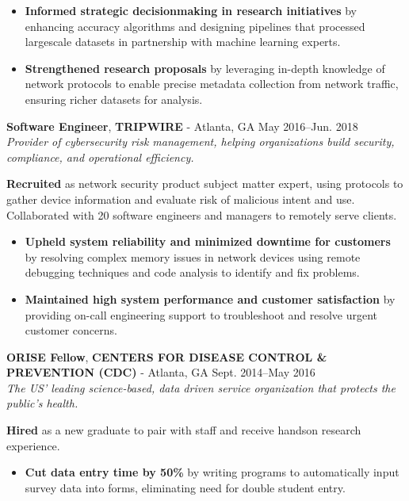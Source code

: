 \documentclass[a4paper,skipsamekey,11pt,english]{curve}
\newcommand{\makeWorkHistoryTitle}[5]{
  \begin{tcolorbox}[colback=base1!10,colframe=base1!10,frame hidden]
    {\color{blue}\textbf{#1}}, \textbf{#2} - #3 \hfill #4\\
    {\small\textit{#5}}
  \end{tcolorbox}
}
\begin{document}
  \begin{itemize}
    \item \textbf{Informed strategic decision\-making in research initiatives}
    by enhancing accuracy algorithms and designing pipelines that processed
    large\-scale datasets in partnership with machine learning experts.
    \item \textbf{Strengthened research proposals} by leveraging in-depth
    knowledge of network protocols to enable precise metadata collection from
    network traffic, ensuring richer datasets for analysis.
  \end{itemize}

  \makeWorkHistoryTitle
    {Software Engineer}
    {TRIPWIRE}
    {Atlanta, GA}
    {May 2016–Jun. 2018}
    {
      Provider of cybersecurity risk management, helping organizations build
      security, compliance, and operational efficiency.
    }

  \textbf{Recruited} as network security product subject matter expert, using
  protocols to gather device information and evaluate risk of malicious intent
  and use. Collaborated with 20 software engineers and managers to remotely
  serve clients.

  \begin{itemize}
    \item \textbf{Upheld system reliability and minimized downtime for customers}
    by resolving complex memory issues in network devices using remote debugging
    techniques and code analysis to identify and fix problems.
    \item \textbf{Maintained high system performance and customer satisfaction} by
    providing on-call engineering support to troubleshoot and resolve urgent
    customer concerns.
  \end{itemize}

  \makeWorkHistoryTitle
    {ORISE Fellow}
    {CENTERS FOR DISEASE CONTROL \& PREVENTION (CDC)}
    {Atlanta, GA}
    {Sept. 2014–May 2016}
    {
      The US' leading science-based, data driven service organization that
      protects the public's health.
    }
  \textbf{Hired} as a new graduate to pair with staff and receive hands\-on
  research experience.

  \begin{itemize}
    \item \textbf{Cut data entry time by 50\%} by writing programs to
    automatically input survey data into forms, eliminating need for
    double student entry.
  \end{itemize}
\end{document}
